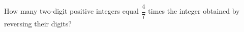 How many two-digit positive integers equal $\dfrac{4}{7}$ times the integer obtained by reversing their digits?
